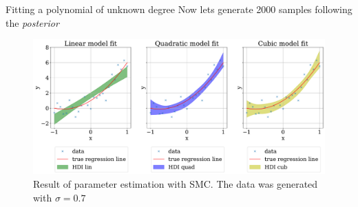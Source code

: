 \documentclass[11pt,aspectratio=1610,dvipsnames]{beamer}
\begin{document}
\begin{frame}{Fitting a polynomial of unknown degree}
	Now lets generate 2000 samples following the \emph{posterior}
	\begin{figure}
		\centering
		\includegraphics[width=\linewidth]{figs/HDI_sigma_07a.pdf}
		\caption{Result of parameter estimation with SMC. The data was generated with $\sigma=0.7$}
	\end{figure}
\end{frame}
\end{document}
